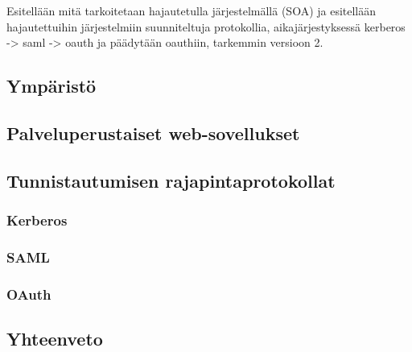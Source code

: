 Esitellään mitä tarkoitetaan hajautetulla järjestelmällä (SOA) ja esitellään hajautettuihin järjestelmiin suunniteltuja protokollia, aikajärjestyksessä  kerberos -> saml -> oauth ja päädytään oauthiin, tarkemmin versioon 2.


\subsection{Ympäristö}

\subsection{Palveluperustaiset web-sovellukset}

\subsection{Tunnistautumisen rajapintaprotokollat}

\subsubsection{Kerberos}

\subsubsection{SAML}

\subsubsection{OAuth}

\subsection{Yhteenveto}
